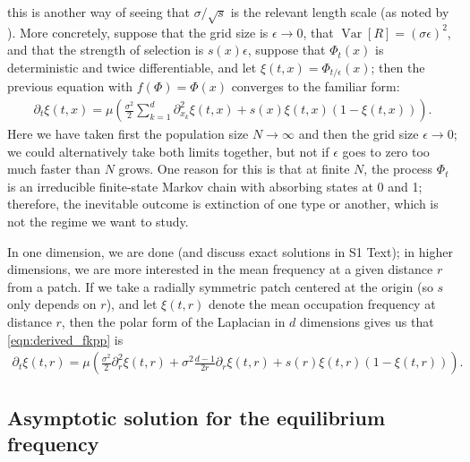 \documentclass[10pt,letterpaper]{article}
\newcommand{\citet}[1]{\cite{#1}}
\DeclareMathOperator{\var}{Var}
\begin{document}
this is another way of seeing that $\sigma/\sqrt{s}$ is the relevant length scale (as noted by \citet{slatkin1973geneflow}).
More concretely, suppose that the grid size is $\epsilon \to 0$, 
that $\var[R] = (\sigma \epsilon)^2$, and that the strength of selection is $s(x) \epsilon$,
suppose that $\Phi_t(x)$ is deterministic and twice differentiable,
and let $\xi(t,x) = \Phi_{t/\epsilon}(x)$;
then the previous equation with $f(\Phi) = \Phi(x)$ converges to the familiar form:
\begin{align}
  \label{eqn:derived_fkpp}
  \partial_t \xi(t,x) = \mu \left( \frac{\sigma^2}{2} \sum_{k=1}^d \partial_{x_k}^2 \xi(t,x) + s(x) \xi(t,x) (1-\xi(t,x)) \right) .
\end{align}
Here we have taken first the population size $N \to \infty$ and then the grid size $\epsilon \to 0$;
we could alternatively take both limits together, but not if $\epsilon$ goes to zero too much faster than $N$ grows.
One reason for this is that at finite $N$,
the process $\Phi_t$ is an irreducible finite-state Markov chain with absorbing states at 0 and 1;
therefore, the inevitable outcome is extinction of one type or another,
which is not the regime we want to study.

In one dimension, we are done (and discuss exact solutions in S1 Text);
in higher dimensions, we are more interested in the mean frequency at a given distance $r$ from a patch.
If we take a radially symmetric patch centered at the origin (so $s$ only depends on $r$), 
and let $\xi(t,r)$ denote the mean occupation frequency at distance $r$,
then the polar form of the Laplacian in $d$ dimensions gives us that \eqref{eqn:derived_fkpp} is
\begin{align}
  \label{eqn:radial_fkpp}
  \partial_t \xi(t,r) = \mu \left( \frac{\sigma^2}{2} \partial_{r}^2 \xi(t,r) + \sigma^2\frac{d-1}{2r} \partial_r \xi(t,r) + s(r) \xi(t,r) (1-\xi(t,r)) \right) .
\end{align}


\subsection*{Asymptotic solution for the equilibrium frequency} 
\label{apx:asymptotics}
\end{document}
